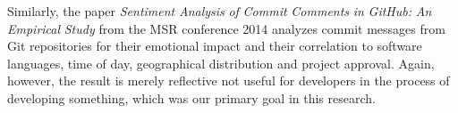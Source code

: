 Similarly, the paper \emph{Sentiment} \emph{Analysis} \emph{of} \emph{Commit} \emph{Comments} \emph{in} \emph{GitHub:} \emph{An} \emph{Empirical} \emph{Study}\cite{Sentiment} from the MSR conference 2014 analyzes commit messages from Git repositories for their emotional impact and their correlation to software languages, time of day, geographical distribution and project approval. Again, however, the result is merely reflective not useful for developers in the process of developing something, which was our primary goal in this research.

%
%
%
%
%
%
